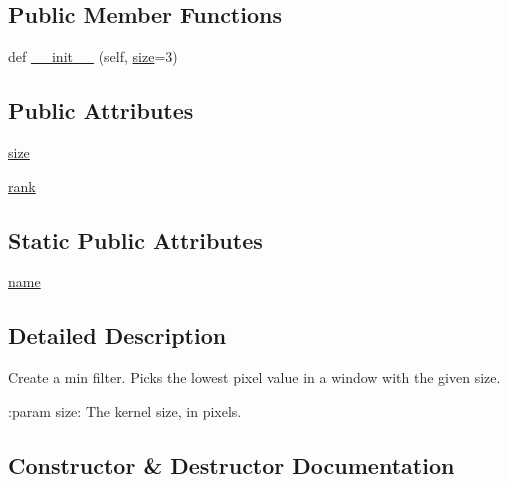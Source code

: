 \subsection*{Public Member Functions}
\begin{DoxyCompactItemize}
\item 
def \hyperlink{classPIL_1_1ImageFilter_1_1MinFilter_a6b75a5545a93cd37333ab8aefe92d987}{\+\_\+\+\_\+init\+\_\+\+\_\+} (self, \hyperlink{classPIL_1_1ImageFilter_1_1MinFilter_a2952632835f3f85662924e5362319bfb}{size}=3)
\end{DoxyCompactItemize}
\subsection*{Public Attributes}
\begin{DoxyCompactItemize}
\item 
\hyperlink{classPIL_1_1ImageFilter_1_1MinFilter_a2952632835f3f85662924e5362319bfb}{size}
\item 
\hyperlink{classPIL_1_1ImageFilter_1_1MinFilter_a97762a4e22c810414955ec1439c0902d}{rank}
\end{DoxyCompactItemize}
\subsection*{Static Public Attributes}
\begin{DoxyCompactItemize}
\item 
\hyperlink{classPIL_1_1ImageFilter_1_1MinFilter_aedfa4caf97e1f437a147239b43be1111}{name}
\end{DoxyCompactItemize}


\subsection{Detailed Description}
\begin{DoxyVerb}Create a min filter.  Picks the lowest pixel value in a window with the
given size.

:param size: The kernel size, in pixels.
\end{DoxyVerb}
 

\subsection{Constructor \& Destructor Documentation}
\mbox{\label{classPIL_1_1ImageFilter_1_1MinFilter_a6b75a5545a93cd37333ab8aefe92d987}} 
